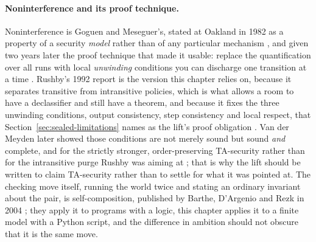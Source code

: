 \documentclass[11pt,a4paper]{article}
\theoremstyle{definition}
\begin{document}
\paragraph{Noninterference and its proof technique.}
Noninterference is Goguen and Meseguer's, stated at Oakland in 1982 as a
property of a security \emph{model} rather than of any particular mechanism
, and given two years later the proof technique that
made it usable: replace the quantification over all runs with local
\emph{unwinding} conditions you can discharge one transition at a time
. Rushby's 1992 report is the version this chapter
relies on, because it separates transitive from intransitive policies, which
is what allows a room to have a declassifier and still have a theorem, and
because it fixes the three unwinding conditions, output
consistency, step consistency and local respect, that
Section~\ref{sec:sealed-limitations} names as the lift's proof obligation
. Van der Meyden later showed those conditions are not merely
sound but sound \emph{and} complete, and for the strictly stronger,
order-preserving TA-security rather than for the intransitive purge Rushby was
aiming at ; that is why the lift should be written to claim
TA-security rather than to settle for what it was pointed at. The checking
move itself, running the world twice and stating an ordinary invariant about
the pair, is self-composition, published by Barthe, D'Argenio and Rezk in 2004
; they apply it to programs with a logic, this chapter applies it
to a finite model with a Python script, and the difference in ambition should
not obscure that it is the same move.
\end{document}
